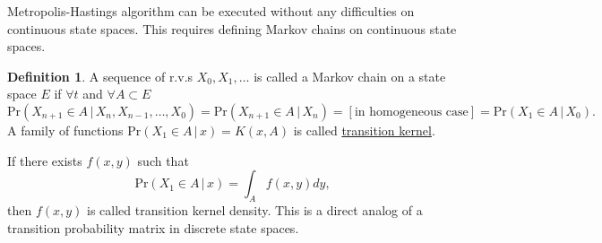 \documentclass[11pt]{article}\usepackage[]{graphicx}\usepackage[]{color}
\numberwithin{algorithm}{section}
\newcommand{\cprob}[2]{\ensuremath{\text{Pr}\left(#1 \,|\,#2\right)}}
\theoremstyle{remark}
\theoremstyle{definition}
\newtheorem*{define}{Definition}
\begin{document}
Metropolis-Hastings algorithm can be executed without any difficulties on continuous
state spaces. This requires defining Markov chains on continuous state spaces. 
\begin{define}
  A sequence of r.v.s $X_0, X_1, \dots$ is called a Markov chain on a state space $E$ if 
  $\forall t$ and $\forall A \subset E$
  \[
  \cprob{X_{n+1} \in A}{X_n,X_{n-1},\dots,X_0} = \cprob{X_{n+1} \in A}{X_n} = [\text{in homogeneous case}]
    = \cprob{X_1 \in A}{X_0}.
  \]
  A family of functions $\cprob{X_1 \in A}{x} = K(x,A)$ is called \underline{transition kernel}.
  \par
  If there exists $f(x,y)$ such that 
  \[
  \cprob{X_1 \in A}{x} = \int_A f(x,y)dy,
  \]
  then $f(x,y)$ is called transition kernel density. This is a direct analog of a transition probability
  matrix in discrete state spaces.
\end{define}
\end{document}
